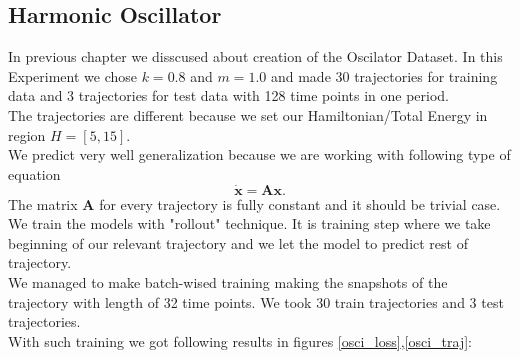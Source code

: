 \subsection{Harmonic Oscillator}
In previous chapter we disscused about creation of the Oscilator Dataset.
In this Experiment we chose $k=0.8$ and $m=1.0$ and made 30 trajectories for training data and 3 trajectories for test data with 128 time points in one period.\\
The trajectories are different because we set our Hamiltonian/Total Energy in region $H=[5,15]$.\\ We predict very well generalization because we are working with following type of equation\begin{equation}
	\dot{\mathbf{x}} = \mathbf{A}\mathbf{x}.
\end{equation} The matrix $\mathbf{A}$ for every trajectory is fully constant and it should be trivial case.\\
We train the models with "rollout" technique. It is training step where we take beginning of our relevant trajectory and we let the model to predict rest of trajectory.\\ 
We managed to make batch-wised training making the snapshots of the trajectory with length of 32 time points. We took 30 train trajectories and 3 test trajectories.  \\
With such training we got following results in figures \ref{osci_loss},\ref{osci_traj}: 
